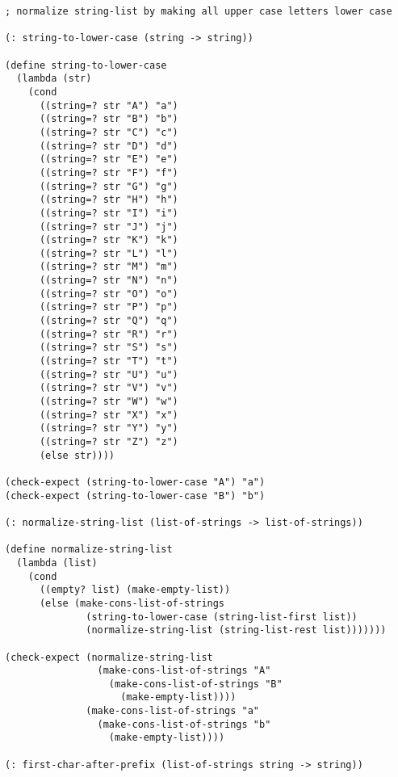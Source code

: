 \documentclass[a4paper,12pt]{article}
\begin{document}
\begin{verbatim}
; normalize string-list by making all upper case letters lower case

(: string-to-lower-case (string -> string))

(define string-to-lower-case
  (lambda (str)
    (cond
      ((string=? str "A") "a")
      ((string=? str "B") "b")
      ((string=? str "C") "c")
      ((string=? str "D") "d")
      ((string=? str "E") "e")
      ((string=? str "F") "f")
      ((string=? str "G") "g")
      ((string=? str "H") "h")
      ((string=? str "I") "i")
      ((string=? str "J") "j")
      ((string=? str "K") "k")
      ((string=? str "L") "l")
      ((string=? str "M") "m")
      ((string=? str "N") "n")
      ((string=? str "O") "o")
      ((string=? str "P") "p")
      ((string=? str "Q") "q")
      ((string=? str "R") "r")
      ((string=? str "S") "s")
      ((string=? str "T") "t")
      ((string=? str "U") "u")
      ((string=? str "V") "v")
      ((string=? str "W") "w")
      ((string=? str "X") "x")
      ((string=? str "Y") "y")
      ((string=? str "Z") "z")
      (else str))))

(check-expect (string-to-lower-case "A") "a")
(check-expect (string-to-lower-case "B") "b")

(: normalize-string-list (list-of-strings -> list-of-strings))

(define normalize-string-list
  (lambda (list)
    (cond
      ((empty? list) (make-empty-list))
      (else (make-cons-list-of-strings
              (string-to-lower-case (string-list-first list))
              (normalize-string-list (string-list-rest list)))))))

(check-expect (normalize-string-list
                (make-cons-list-of-strings "A"
                  (make-cons-list-of-strings "B"
                    (make-empty-list))))
              (make-cons-list-of-strings "a"
                (make-cons-list-of-strings "b"
                  (make-empty-list))))

(: first-char-after-prefix (list-of-strings string -> string))


\end{verbatim}
\end{document}
